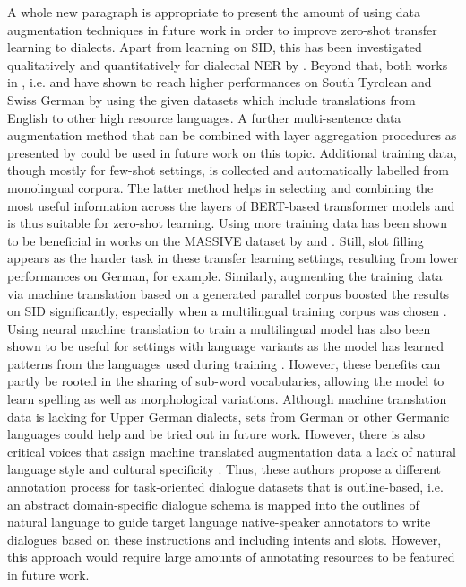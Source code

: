 \documentclass[11pt,a4paper,twoside,openright]{scrbook}
\begin{document}
A whole new paragraph is appropriate to present the amount of using data augmentation techniques in future work in order to improve zero-shot transfer learning to dialects. Apart from learning on SID, this has been investigated qualitatively and quantitatively for dialectal NER by \citet{peng-etal-2024-sebastian-basti}. Beyond that, both works in \citet{2023-findings-vardial}, i.e. \citet{kwon-etal-2023-sidlr} and \citet{srivastava-chiang-2023-fine} have shown to reach higher performances on South Tyrolean and Swiss German by using the given datasets which include translations from English to other high resource languages. A further multi-sentence data augmentation method that can be combined with layer aggregation procedures as presented by \citet{razumovskaia-etal-2022-data} could be used in future work on this topic. Additional training data, though mostly for few-shot settings, is collected and automatically labelled from monolingual corpora. The latter method helps in selecting and combining the most useful information across the layers of BERT-based transformer models and is thus suitable for zero-shot learning. Using more training data has been shown to be beneficial in works on the MASSIVE dataset by \citet{fitzgerald-etal-2023-massive} and \citet{jhan-etal-2022-c5l7}. Still, slot filling appears as the harder task in these transfer learning settings, resulting from lower performances on German, for example. Similarly, augmenting the training data via machine translation based on a generated parallel corpus boosted the results on SID significantly, especially when a multilingual training corpus was chosen \citep{jhan-etal-2022-c5l7}. Using neural machine translation to train a multilingual model has also been shown to be useful for settings with language variants as the model has learned patterns from the languages used during training \citep{Zampieri_Nakov_Scherrer_2020}. However, these benefits can partly be rooted in the sharing of sub-word vocabularies, allowing the model to learn spelling as well as morphological variations. Although machine translation data is lacking for Upper German dialects, sets from German or other Germanic languages could help and be tried out in future work. However, there is also critical voices that assign machine translated augmentation data a lack of natural language style and cultural specificity \citep{majewska-etal-2023-cross}. Thus, these authors propose a different annotation process for task-oriented dialogue datasets that is outline-based, i.e. an abstract domain-specific dialogue schema is mapped into the outlines of natural language to guide target language native-speaker annotators to write dialogues based on these instructions and including intents and slots. However, this approach would require large amounts of annotating resources to be featured in future work.
\end{document}
